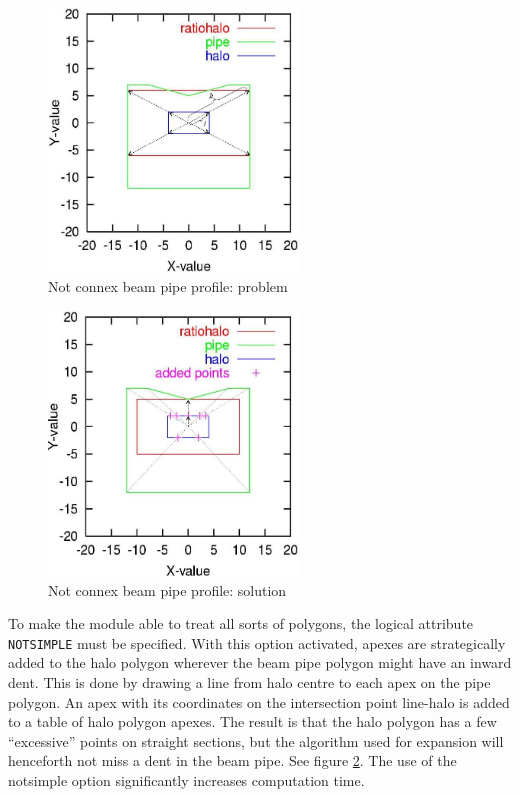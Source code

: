 \begin{figure}[htb]
  \begin{center}
    \includegraphics[width=250px]{jpg/notsimple1.jpg}
    \caption{Not connex beam pipe profile: problem}
    \label{fig:notsimple1}
  \end{center}
\end{figure}

\begin{figure}[htb]
  \begin{center}
    \includegraphics[width=250px]{jpg/notsimple2.jpg}    
    \caption{Not connex beam pipe profile: solution}
    \label{fig:notsimple2}
  \end{center}
\end{figure}

To make the module able to treat all sorts of polygons, the logical
attribute {\tt NOTSIMPLE} must be specified. With this option activated,
apexes are strategically added to the halo polygon wherever the beam pipe
polygon might have an inward dent. This is done by drawing a line from
halo centre to each apex on the pipe polygon. An apex with its
coordinates on the intersection point line-halo is added to a table of
halo polygon apexes. The result is that the halo polygon has a few
``excessive'' points on straight sections, but the algorithm used for
expansion will henceforth not miss a dent in the beam pipe. See
figure \ref{fig:notsimple2}. The use of the
notsimple option significantly increases computation time. 


